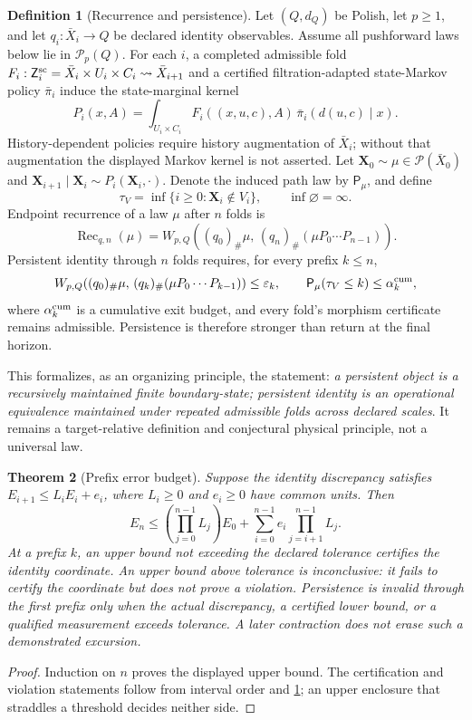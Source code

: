 \documentclass[11pt,a4paper]{article}
\theoremstyle{definition}
\newtheorem{definition}{Definition}[section]
\theoremstyle{plain}
\newtheorem{theorem}[definition]{Theorem}
\theoremstyle{remark}
\newcommand{\Prob}{\mathsf P}
\newcommand{\push}{_{\#}}
\begin{document}
\begin{definition}[Recurrence and persistence]\label{def:persistence}
Let \((Q,d_Q)\) be Polish, let \(p\ge1\), and let
\(q_i:\bar X_i\to Q\) be declared identity observables.  Assume all
pushforward laws below lie in \(\mathcal P_p(Q)\).  For each \(i\), a completed
admissible fold
\(F_i:\mathsf Z_i^{\rm sc}
=\bar X_i\times U_i\times C_i\rightsquigarrow\bar X_{i+1}\)
and a certified filtration-adapted state-Markov policy \(\bar\pi_i\) induce
the state-marginal kernel
\[
P_i(x,A)=\int_{U_i\times C_i}
F_i((x,u,c),A)\,\bar\pi_i(d(u,c)\mid x).
\]
History-dependent policies require history augmentation of \(\bar X_i\);
without that augmentation the displayed Markov kernel is not asserted.
Let \(\mathbf X_0\sim\mu\in\mathcal P(\bar X_0)\) and
\(\mathbf X_{i+1}\mid\mathbf X_i\sim
P_i(\mathbf X_i,\cdot)\).  Denote the induced path law by \(\Prob_\mu\), and
define
\[
\tau_V=\inf\{i\ge0:\mathbf X_i\notin V_i\},
\qquad \inf\varnothing=\infty .
\]
Endpoint recurrence of a law \(\mu\) after \(n\) folds is
\[
\operatorname{Rec}_{q,n}(\mu)
=W_{p,Q}\!\left((q_0)\push\mu,\,
(q_n)\push(\mu P_0\cdots P_{n-1})\right).
\]
Persistent identity through \(n\) folds requires, for every prefix
\(k\le n\),
\[
W_{p,Q}\!\left((q_0)\push\mu,\,
(q_k)\push(\mu P_0\cdots P_{k-1})\right)\le\varepsilon_k,
\qquad
\Prob_\mu(\tau_V\le k)\le\alpha_k^{\rm cum},
\]
where \(\alpha_k^{\rm cum}\) is a cumulative exit budget, and every fold's morphism
certificate remains admissible.  Persistence is therefore stronger than
return at the final horizon.
\end{definition}

This formalizes, as an organizing principle, the statement:
\emph{a persistent object is a recursively maintained finite boundary-state;
persistent identity is an operational equivalence maintained under repeated
admissible folds across declared scales}.  It remains a target-relative
definition and conjectural physical principle, not a universal law.

\begin{theorem}[Prefix error budget]\label{thm:persistencebudget}
Suppose the identity discrepancy satisfies
\(E_{i+1}\le L_iE_i+e_i\), where \(L_i\ge0\) and \(e_i\ge0\) have common units.
Then
\[
E_n\le
\left(\prod_{j=0}^{n-1}L_j\right)E_0+
\sum_{i=0}^{n-1}e_i\prod_{j=i+1}^{n-1}L_j.
\]
At a prefix \(k\), an upper bound not exceeding the declared tolerance
certifies the identity coordinate.  An upper bound above tolerance is
inconclusive: it fails to certify the coordinate but does not prove a
violation.  Persistence is invalid through the first prefix only when the
actual discrepancy, a certified lower bound, or a qualified measurement
exceeds tolerance.  A later contraction does not erase such a demonstrated
excursion.
\end{theorem}
\begin{proof}
Induction on \(n\) proves the displayed upper bound.  The certification and
violation statements follow from interval order and
\cref{def:persistence}; an upper enclosure that straddles a threshold decides
neither side.
\end{proof}
\end{document}

